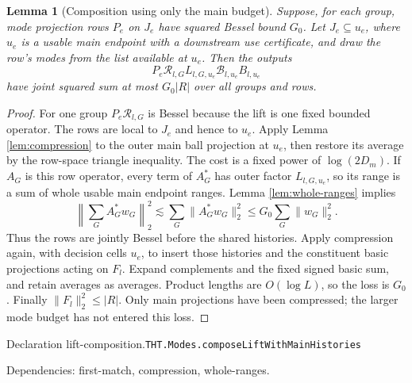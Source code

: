 \documentclass[11pt]{article}
\newtheorem{lemma}[theorem]{Lemma}
\theoremstyle{definition}
\numberwithin{equation}{section}
\newcommand{\bp}[3]{\par\smallskip\begingroup\footnotesize
\noindent\hypertarget{bp:#1}{\textsf{Declaration #1.}}\quad\nolinkurl{#2}\par
\noindent\textsf{Dependencies:} #3.\par\endgroup\smallskip}
\begin{document}
\begin{lemma}[Composition using only the main budget]\label{lem:lift-composition}
Suppose, for each group, mode projection rows $P_e$ on $J_e$ have squared Bessel bound $G_0$. Let $J_e\subseteq u_e$, where $u_e$ is a usable main endpoint with a downstream use certificate, and draw the row's modes from the list available at $u_e$. Then the outputs
\[
 P_e\mathcal R_{l,G}L_{l,G,u_e}\mathcal B_{l,u_e}B_{l,u_e}
\]
have joint squared sum at most $G_0|R|$ over all groups and rows.
\end{lemma}
\begin{proof}
For one group $P_e\mathcal R_{l,G}$ is Bessel because the lift is one fixed bounded operator. The rows are local to $J_e$ and hence to $u_e$. Apply Lemma \ref{lem:compression} to the outer main ball projection at $u_e$, then restore its average by the row-space triangle inequality. The cost is a fixed power of $\log(2D_m)$. If $A_G$ is this row operator, every term of $A_G^*$ has outer factor $L_{l,G,u_e}$, so its range is a sum of whole usable main endpoint ranges. Lemma \ref{lem:whole-ranges} implies
\[
 \left\|\sum_GA_G^*w_G\right\|_2^2\lesssim\sum_G\|A_G^*w_G\|_2^2
 \le G_0\sum_G\|w_G\|_2^2.
\]
Thus the rows are jointly Bessel before the shared histories. Apply compression again, with decision cells $u_e$, to insert those histories and the constituent basic projections acting on $F_l$. Expand complements and the fixed signed basic sum, and retain averages as averages. Product lengths are $O(\log L)$, so the loss is $G_0$. Finally $\|F_l\|_2^2\le|R|$. Only main projections have been compressed; the larger mode budget has not entered this loss.
\end{proof}
\bp{lift-composition}{THT.Modes.composeLiftWithMainHistories}{first-match, compression, whole-ranges}
\end{document}
